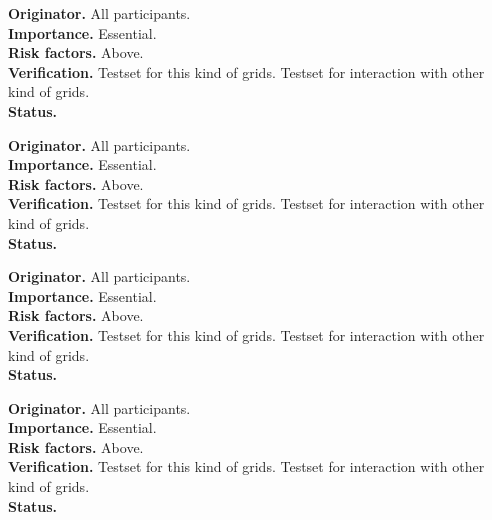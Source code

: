 \begin{reqlist}
{\bf Originator.} All participants. \\
{\bf Importance.} Essential. \\
{\bf Risk factors.} Above. \\
{\bf Verification.} Testset for this kind of grids. Testset for interaction 
with other kind of grids. \\
{\bf Status.} 
\end{reqlist}



\begin{reqlist}
{\bf Originator.} All participants. \\
{\bf Importance.} Essential. \\
{\bf Risk factors.} Above. \\
{\bf Verification.} Testset for this kind of grids. Testset for interaction 
with other kind of grids. \\
{\bf Status.} 
\end{reqlist}



\begin{reqlist}
{\bf Originator.} All participants. \\
{\bf Importance.} Essential. \\
{\bf Risk factors.} Above. \\
{\bf Verification.} Testset for this kind of grids. Testset for interaction 
with other kind of grids. \\
{\bf Status.} 
\end{reqlist}



\begin{reqlist}
{\bf Originator.} All participants. \\
{\bf Importance.} Essential. \\
{\bf Risk factors.} Above. \\
{\bf Verification.} Testset for this kind of grids. Testset for interaction 
with other kind of grids. \\
{\bf Status.} 
\end{reqlist}



